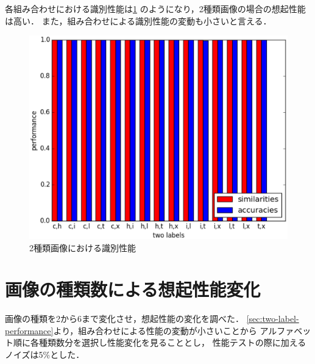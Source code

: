 \documentclass[10pt,twocolumn]{jarticle}
\newcommand{\figref}[1]{\figurename\ref{fig:#1}}
\begin{document}
各組み合わせにおける識別性能は\figref{two-label-performance}
のようになり，2種類画像の場合の想起性能は高い．
また，組み合わせによる識別性能の変動も小さいと言える．
\begin{figure}[htpb]
  \centering
    \includegraphics[width=\columnwidth]{figs/two_label_performance}
    \caption{2種類画像における識別性能}
    \label{fig:two-label-performance}
\end{figure}


\section{画像の種類数による想起性能変化}
画像の種類を2から6まで変化させ，想起性能の変化を調べた．
\ref{sec:two-label-performance}より，組み合わせによる性能の変動が小さいことから
アルファベット順に各種類数分を選択し性能変化を見ることとし，
性能テストの際に加えるノイズは5\%とした．
\end{document}
